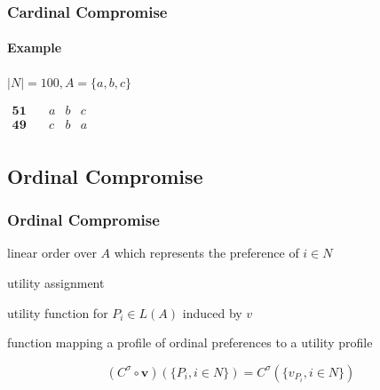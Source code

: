 \documentclass{beamer}
\newcommand{\R}{\mathbb{R}}
\newcommand{\paretopt}{\mathit{PO}}
\newcommand{\vpr}{\mathbf{v}}
\DeclareMathOperator*{\argmin}{arg\,min}
\begin{document}
\begin{frame}
	\frametitle{Cardinal Compromise}
	\framesubtitle{Example}
	$|N|=100, A=\{a,b,c\}$
	\begin{center}
		$
		\begin{array}{cccc}
		\mathbf{51} \quad &a&b&c\\
		\mathbf{49} \quad &c&b&a\\
		\end{array}
		$
	\end{center}
	\onslide<5->{ \[ C^{\sigma_{avg} }(u) = \argmin_{x \in \paretopt(u)} (\sigma \circ \lambda^u)(x) = b \]}
\end{frame}

\subsection{Ordinal Compromise}
\begin{frame}
	\frametitle{Ordinal Compromise}
	\begin{description}
		\item[$P_i \in L(A)$] linear order over $A$ which represents the preference of $i\in N$
		\item[$v:\left\{ 1,..., m\right\} \rightarrow \R$] utility assignment
		\item[$v_{P_{i}}$ $\in U(A)$] utility function for $P_{i}\in L(A)$ induced by $v$
		\item[$\mathbf{v}: L(A)^N \rightarrow U(A)^N$] function mapping a profile of ordinal preferences to a utility profile 
	\end{description}
	 \begin{block}{}
		\[(C^{\sigma }\circ \vpr)(\{P_i, i \in N\}) = C^{\sigma}(\{v_{P_i}, i \in N\})\]
	\end{block}
\end{frame}
\end{document}
